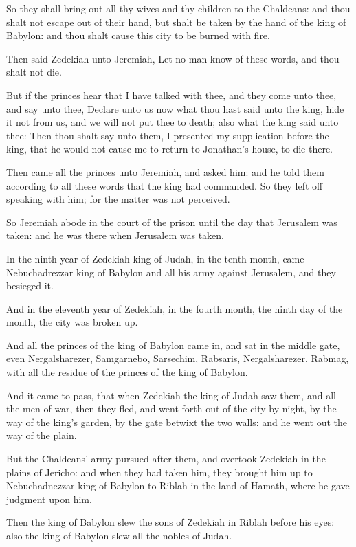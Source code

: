 \Verse So they shall bring out all thy wives and thy children to the Chaldeans: and thou shalt not escape out of their hand, but shalt be taken by the hand of the king of Babylon: and thou shalt cause this city to be burned with fire.

\Verse Then said Zedekiah unto Jeremiah, Let no man know of these words, and thou shalt not die.

\Verse But if the princes hear that I have talked with thee, and they come unto thee, and say unto thee, Declare unto us now what thou hast said unto the king, hide it not from us, and we will not put thee to death; also what the king said unto thee: \Verse Then thou shalt say unto them, I presented my supplication before the king, that he would not cause me to return to Jonathan's house, to die there.

\Verse Then came all the princes unto Jeremiah, and asked him: and he told them according to all these words that the king had commanded. So they left off speaking with him; for the matter was not perceived.

\Verse So Jeremiah abode in the court of the prison until the day that Jerusalem was taken: and he was there when Jerusalem was taken.


\Chapter
\Verse In the ninth year of Zedekiah king of Judah, in the tenth month, came Nebuchadrezzar king of Babylon and all his army against Jerusalem, and they besieged it.

\Verse And in the eleventh year of Zedekiah, in the fourth month, the ninth day of the month, the city was broken up.

\Verse And all the princes of the king of Babylon came in, and sat in the middle gate, even Nergalsharezer, Samgarnebo, Sarsechim, Rabsaris, Nergalsharezer, Rabmag, with all the residue of the princes of the king of Babylon.

\Verse And it came to pass, that when Zedekiah the king of Judah saw them, and all the men of war, then they fled, and went forth out of the city by night, by the way of the king's garden, by the gate betwixt the two walls: and he went out the way of the plain.

\Verse But the Chaldeans' army pursued after them, and overtook Zedekiah in the plains of Jericho: and when they had taken him, they brought him up to Nebuchadnezzar king of Babylon to Riblah in the land of Hamath, where he gave judgment upon him.

\Verse Then the king of Babylon slew the sons of Zedekiah in Riblah before his eyes: also the king of Babylon slew all the nobles of Judah.

